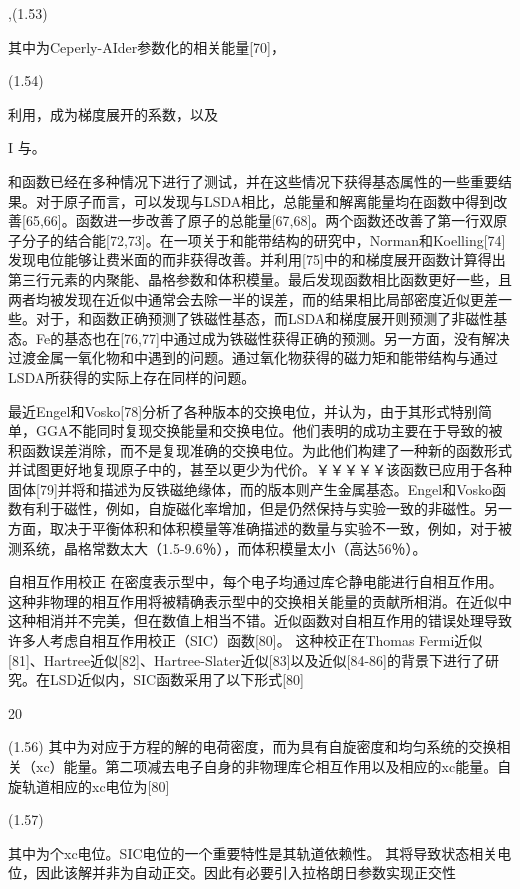 ,(1.53)

其中为Ceperly-AIder参数化的相关能量[70]，

(1.54)

利用，成为梯度展开的系数，以及

I 
与。






和函数已经在多种情况下进行了测试，并在这些情况下获得基态属性的一些重要结果。对于原子而言，可以发现与LSDA相比，总能量和解离能量均在函数中得到改善[65,66]。函数进一步改善了原子的总能量[67,68]。两个函数还改善了第一行双原子分子的结合能[72,73]。在一项关于和能带结构的研究中，Norman和Koelling[74]发现电位能够让费米面的而非获得改善。并利用[75]中的和梯度展开函数计算得出第三行元素的内聚能、晶格参数和体积模量。最后发现函数相比函数更好一些，且两者均被发现在近似中通常会去除一半的误差，而的结果相比局部密度近似更差一些。对于，和函数正确预测了铁磁性基态，而LSDA和梯度展开则预测了非磁性基态。Fe的基态也在[76,77]中通过成为铁磁性获得正确的预测。另一方面，没有解决过渡金属一氧化物和中遇到的问题。通过氧化物获得的磁力矩和能带结构与通过LSDA所获得的实际上存在同样的问题。

最近Engel和Vosko[78]分析了各种版本的交换电位，并认为，由于其形式特别简单，GGA不能同时复现交换能量和交换电位。他们表明的成功主要在于导致的被积函数误差消除，而不是复现准确的交换电位。为此他们构建了一种新的函数形式并试图更好地复现原子中的，甚至以更少为代价。￥￥￥￥￥该函数已应用于各种固体[79]并将和描述为反铁磁绝缘体，而的版本则产生金属基态。Engel和Vosko函数有利于磁性，例如，自旋磁化率增加，但是仍然保持与实验一致的非磁性。另一方面，取决于平衡体积和体积模量等准确描述的数量与实验不一致，例如，对于被测系统，晶格常数太大（1.5-9.6％），而体积模量太小（高达56％）。

自相互作用校正  
在密度表示型中，每个电子均通过库仑静电能进行自相互作用。这种非物理的相互作用将被精确表示型中的交换相关能量的贡献所相消。在近似中这种相消并不完美，但在数值上相当不错。近似函数对自相互作用的错误处理导致许多人考虑自相互作用校正（SIC）函数[80]。 这种校正在Thomas Fermi近似[81]、Hartree近似[82]、Hartree-Slater近似[83]以及近似[84-86]的背景下进行了研究。在LSD近似内，SIC函数采用了以下形式[80]


20



(1.56)
其中为对应于方程的解的电荷密度，而为具有自旋密度和均匀系统的交换相关（xc）能量。第二项减去电子自身的非物理库仑相互作用以及相应的xc能量。自旋轨道相应的xc电位为[80]

(1.57)

其中为个xc电位。SIC电位的一个重要特性是其轨道依赖性。
其将导致状态相关电位，因此该解并非为自动正交。因此有必要引入拉格朗日参数实现正交性

